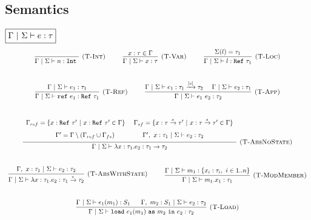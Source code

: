 \documentclass{llncs}
\newcommand{\keywadj}[1]{\mathtt{#1}}
\newcommand{\keyw}[1]{\keywadj{#1}~}
\newcommand{\reftt}{\mathtt{ref}~}
\newcommand{\Reftt}{\mathtt{Ref}~}
\newcommand{\Inttt}{\mathtt{Int}~}
\begin{document}
\newpage

\subsection{Semantics}

$\fbox{$\Gamma~|~\Sigma \vdash e : \tau$}$
\[
\begin{array}{c}
\infer[\textsc{(T-Int)}]
  {\Gamma~|~\Sigma \vdash n : \Inttt}
  {}
~~~~~~~~  
\infer[\textsc{(T-Var)}]
  {\Gamma~|~\Sigma \vdash x : \tau}
  {x : \tau \in \Gamma}
~~~~~~~~  
\infer[\textsc{(T-Loc)}]
  {\Gamma~|~\Sigma \vdash l : \Reftt \tau_1}
  {\Sigma(l) = \tau_1}\\[5ex]

\infer[\textsc{(T-Ref)}]
  {\Gamma~|~\Sigma \vdash \reftt e_1 : \Reftt \tau_1}
  {\Gamma~|~\Sigma \vdash e_1 : \tau_1}
~~~~~~~~
\infer[\textsc{(T-App)}]
  {\Gamma~|~\Sigma \vdash e_1~e_2 : \tau_2}
  {\Gamma~|~\Sigma \vdash e_1 : \tau_1 \xrightarrow{[s]} \tau_2
  ~~~~ \Gamma~|~\Sigma \vdash e_2 : \tau_1}\\[5ex]

\infer[\textsc{(T-AbsNoState)}]
  {\Gamma~|~\Sigma \vdash \lambda x : \tau_1.e_2 : \tau_1 \rightarrow \tau_2}
  {\def\arraystretch{1.6}
  \begin{array}{c}
\Gamma_{ref} = \{x : \Reftt \tau'~|~ x : \Reftt \tau' \in \Gamma\}~~~~
\Gamma_{sf} = \{ x : \tau \xrightarrow{s} \tau'~|~x : \tau \xrightarrow{s} \tau' \in \Gamma \} \\
\Gamma' = \Gamma \setminus (\Gamma_{ref} \cup \Gamma_{fs})~~~~~~~~~~~~~\Gamma',~x : \tau_1~|~\Sigma \vdash e_2 : \tau_2
  \end{array}}\\[5ex]

\infer[\textsc{(T-AbsWithState)}]
  {\Gamma~|~\Sigma \vdash \lambda x : \tau_1.e_2 : \tau_1 \xrightarrow{s} \tau_2}
  {\Gamma,~x : \tau_1~|~\Sigma \vdash e_2 : \tau_2}
~~~~~~~~
\infer[\textsc{(T-ModMember)}]
  {\Gamma~|~\Sigma \vdash m_1.x_1 : \tau_1}
  {\Gamma~|~\Sigma \vdash m_1 : \{ x_i : \tau_i,~i \in 1..n\}}\\[5ex]

\infer[\textsc{(T-Load)}]
  {\Gamma~|~\Sigma \vdash \keyw{load} e_1(m_1)~\keyw{as} m_2~\keyw{in} e_2 : \tau_2}
  {\Gamma~|~\Sigma \vdash e_1(m_1) : S_1~~~~~\Gamma,~m_2 : S_1~|~\Sigma \vdash e_2 : \tau_2}\\[5ex]



\end{array}\]
\end{document}
